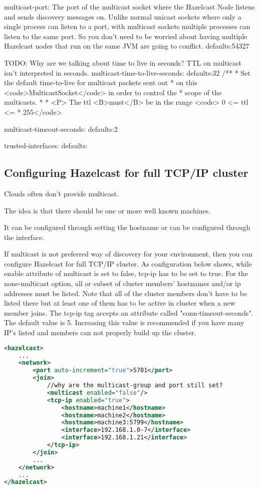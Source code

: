 multicast-port: The port of the multicast socket where the Hazelcast Node listens and sends discovery messages on. Unlike normal unicast sockets where only a single process can listen to a port, with multicast sockets multiple processes can listen to the same port. So you don't need to be worried about having multiple Hazelcast nodes that run on the same JVM are going to conflict.
defaults:54327

TODO: Why are we talking about time to live in seconds? TTL on multicast isn't interpreted in seconds.
multicast-time-to-live-seconds:
defaults:32
/**
   * Set the default time-to-live for multicast packets sent out
   * on this <code>MulticastSocket</code> in order to control the 
   * scope of the multicasts.
   *
   * <P> The ttl <B>must</B> be in the range <code> 0 <= ttl <=
   * 255</code>


multicast-timeout-seconds:
defaults:2

trusted-interfaces:
defaults:


\subsection{Configuring Hazelcast for full TCP/IP cluster}

Clouds often don't provide multicast.

The idea is that there should be one or more well known machines.

It can be configured through setting the hostname or can be configured through the interface. 

If multicast is not preferred way of discovery for your environment, then you can configure Hazelcast for full TCP/IP cluster. As configuration below shows, while enable attribute of multicast is set to false, tcp-ip has to be set to true. For the none-multicast option, all or subset of cluster members' hostnames and/or ip addresses must be listed. Note that all of the cluster members don't have to be listed there but at least one of them has to be active in cluster when a new member joins. The tcp-ip tag accepts an attribute called "conn-timeout-seconds". The default value is 5. Increasing this value is recommended if you have many IP's listed and members can not properly build up the cluster.

\begin{lstlisting}[language=xml]
<hazelcast>
    ...
    <network>
        <port auto-increment="true">5701</port>
        <join>
            //why are the multicast-group and port still set?
            <multicast enabled="false"/>
            <tcp-ip enabled="true">
                <hostname>machine1</hostname>
                <hostname>machine2</hostname>
                <hostname>machine3:5799</hostname>
                <interface>192.168.1.0-7</interface>     
                <interface>192.168.1.21</interface> 
            </tcp-ip>
        </join>
        ...
    </network>
    ...
</hazelcast>
\end{lstlisting}

